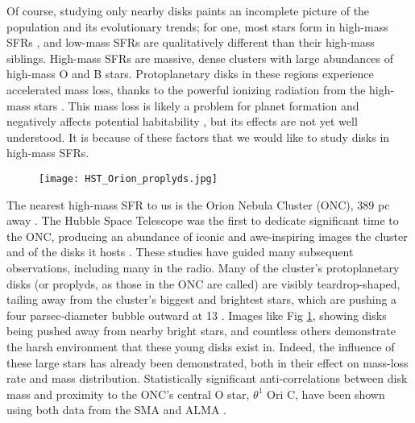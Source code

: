 Of course, studying only nearby disks paints an incomplete picture of the population and its evolutionary trends; for one, most stars form in high-mass SFRs \citep{LadaLada2003,Mann2015}, and low-mass SFRs are qualitatively different than their high-mass siblings. High-mass SFRs are massive, dense clusters with large abundances of high-mass O and B stars. Protoplanetary disks in these regions experience accelerated mass loss, thanks to the powerful ionizing radiation from the high-mass stars \citep{Anderson2013,Kalyaan2015,Xiao2018}. This mass loss is likely a problem for planet formation \citep{Johnstone1998,Ovelar2012} and negatively affects potential habitability \citep{Kruijssen2019}, but its effects are not yet well understood. It is because of these factors that we would like to study disks in high-mass SFRs.


\begin{figure}[t!]
\centering
  \texttt{[image: HST\_Orion\_proplyds.jpg]}
  \label{fig:HST_ONC}
\end{figure}



The nearest high-mass SFR to us is the Orion Nebula Cluster (ONC), 389 pc away \citep{GaiaCollaboration2018}. The Hubble Space Telescope was the first to dedicate significant time to the ONC, producing an abundance of iconic and awe-inspiring images the cluster and of the disks it hosts \citep{Ricci2008}. These studies have guided many subsequent observations, including many in the radio. Many of the cluster's protoplanetary disks (or proplyds, as those in the ONC are called) are visibly teardrop-shaped, tailing away from the cluster's biggest and brightest stars, which are pushing a four parsec-diameter bubble outward at 13 \kms \citep{Pabst2019}. Images like Fig \ref{fig:HST_ONC}, showing disks being pushed away from nearby bright stars, and countless others demonstrate the harsh environment that these young disks exist in. Indeed, the influence of these large stars has already been demonstrated, both in their effect on mass-loss rate and mass distribution. Statistically significant anti-correlations between disk mass and proximity to the ONC's central O star, $\theta^1$ Ori C, have been shown using both data from the SMA \citep{MannWilliams2009} and ALMA \citep{Mann2014,Ansdell2017,Eisner2018}.


